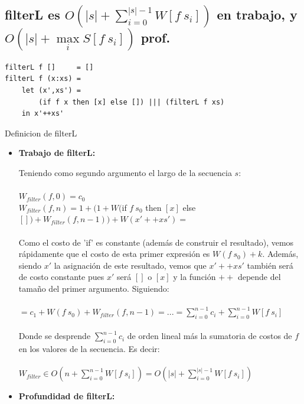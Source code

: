 \documentclass[12pt]{article}
\begin{document}
\subsection{filterL es $O(|s| + \sum\limits_{i=0}^{|s|-1} W[f\ s_i])$ en trabajo, y $O(|s| + \max\limits_{i} S[f\ s_i] )$ prof.}

\begin{table}[h]
\begin{lstlisting}
filterL f []     = []
filterL f (x:xs) = 
    let (x',xs') = 
        (if f x then [x] else []) ||| (filterL f xs) 
    in x'++xs'
\end{lstlisting}
\caption{Definicion de filterL}
\end{table}
\begin{itemize}

\item \textbf{Trabajo de filterL:}

Teniendo como segundo argumento el largo de la secuencia $s$: \\
\\
    $W_{filter}(f, 0) = c_0$ \\
    $W_{filter}(f, n) = 1 + ( 1 + W($if $f\ s_0$ then $[x]$ else $[]) + W_{filter}(f, n-1) ) + W(x'++xs') = $ \\
\\
    Como el costo de 'if' es constante (además de construir el resultado), vemos rápidamente que el costo de esta primer expresión es $W(f\ s_0) + k$.
    Además, siendo $x'$ la asignación de este resultado, vemos que $x'++xs'$ también será de costo constante pues $x'$ será $[]$ o $[x]$ y la función $++$ depende del tamaño del primer argumento. Siguiendo:\\
\\
    $ = c_1 + W(f\ s_0) + W_{filter}(f, n-1) = ... = \sum\limits_{i=0}^{n-1} c_i + \sum\limits_{i=0}^{n-1} W[f\ s_i] $ \\
\\
    Donde se desprende $\sum\limits_{i=0}^{n-1} c_i$ de orden lineal más la sumatoria de costos de $f$ en los valores de la secuencia. Es decir: \\
\\
    $W_{filter} \in O(n + \sum\limits_{i=0}^{n-1} W[f\ s_i] ) = O(|s| + \sum\limits_{i=0}^{|s|-1} W[f\ s_i])$\\

\item \textbf{Profundidad de filterL:}


\end{itemize}
\end{document}
